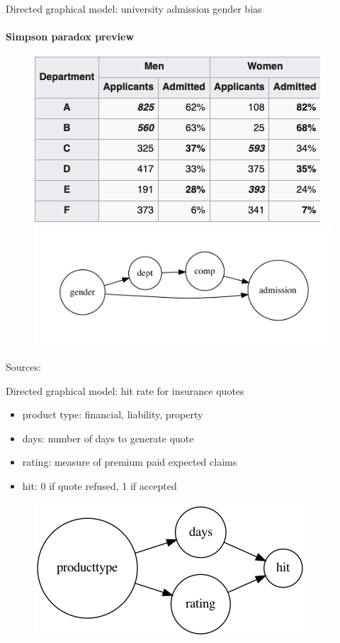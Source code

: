 \begin{frame}{Directed graphical model: university admission gender bias}
  \framesubtitle{Simpson paradox preview}

  \begin{figure}[ht]
    \centering
            \includegraphics[height=0.35\textheight]{graphics/berkeley_later}
            \includegraphics[height=0.35\textheight]{graphics/admission_later}
    \end{figure}
    Sources: \cite{simpson-wikipedia} \cite{Bickel398}
\end{frame}


\begin{frame}{Directed graphical model: hit rate for insurance quotes}
  \begin{itemize}
    \item product type: financial, liability, property
    \item days: number of days to generate quote
    \item rating: measure of premium paid expected claims
    \item hit: 0 if quote refused, 1 if accepted
  \end{itemize}
  \begin{figure}[ht]
    \centering
    \includegraphics[height=0.7\textheight]{graphics/hits}
  \end{figure}
\end{frame}


